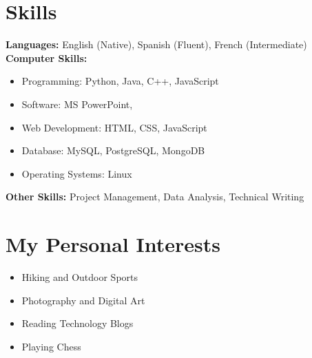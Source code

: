 \documentclass[11pt,a4paper]{article}
\begin{document}
\section*{Skills}
\textbf{Languages:} English (Native), Spanish (Fluent), French (Intermediate)\\[0.2cm]
\textbf{Computer Skills:} 
\begin{itemize}
\item Programming: Python, Java, C++, JavaScript
\item Software: MS PowerPoint, 
\item Web Development: HTML, CSS, JavaScript
\item Database: MySQL, PostgreSQL, MongoDB
\item Operating Systems: Linux
\end{itemize}
\textbf{Other Skills:} Project Management, Data Analysis, Technical Writing

\vspace{0.5cm}

\section*{My Personal Interests}
\begin{itemize}
\item Hiking and Outdoor Sports
\item Photography and Digital Art
\item Reading Technology Blogs
\item Playing Chess 
\end{itemize}
\end{document}
